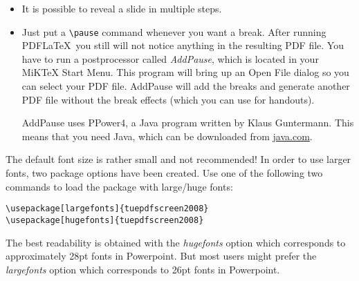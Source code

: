 \documentclass[a4paper]{article}            %
\begin{document}
\begin{screen}
\newpage
{}
\end{screen}

\begin{slidetop}
\begin{itemize}
\item It is possible to reveal a slide in multiple steps.
\pause
\item Just put a \verb|\pause| command whenever you want a break. After running PDF\LaTeX\ you still will not notice anything in the resulting PDF file. You have to run a postprocessor called {\em AddPause}, which is located in your MiKTeX Start Menu. This program will bring up an Open File dialog so you can select your PDF file. AddPause will add the breaks and generate another PDF file without the break effects (which you can use for handouts).

\pause
AddPause uses PPower4, a Java program written by Klaus Guntermann. This means that you need Java, which can be downloaded from \href{http://java.com}{java.com}.
\end{itemize}
\end{slidetop}

\begin{slidetop}

The default font size is rather small and not recommended! In order to use larger fonts, two package options have been created. Use one of the following two commands to load the package with large/huge fonts:

\begin{verbatim}
\usepackage[largefonts]{tuepdfscreen2008}
\usepackage[hugefonts]{tuepdfscreen2008}
\end{verbatim}

The best readability is obtained with the {\em hugefonts} option which corresponds to approximately 28pt fonts in Powerpoint. But most users might prefer the {\em largefonts} option which corresponds to 26pt fonts in Powerpoint.
\end{slidetop}
\end{document}
